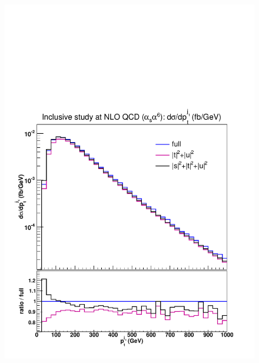 \begin{figure}[hbt]
\centering 
{\includegraphics[scale=0.35]{figures/scanfigures/ptj1_nlo.pdf}}

\end{figure}
